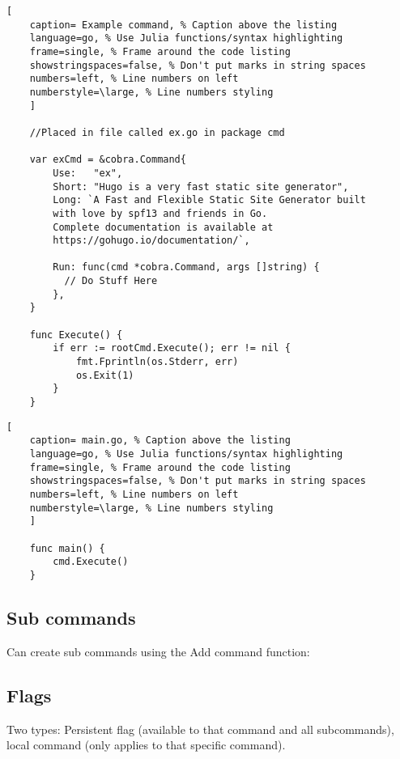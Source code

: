 \documentclass[11pt]{scrartcl} %
\begin{document}
\begin{lstlisting}[
	caption= Example command, % Caption above the listing
	language=go, % Use Julia functions/syntax highlighting
	frame=single, % Frame around the code listing
	showstringspaces=false, % Don't put marks in string spaces
	numbers=left, % Line numbers on left
	numberstyle=\large, % Line numbers styling
	]

	//Placed in file called ex.go in package cmd

	var exCmd = &cobra.Command{
		Use:   "ex",
		Short: "Hugo is a very fast static site generator",
		Long: `A Fast and Flexible Static Site Generator built 
		with love by spf13 and friends in Go.
		Complete documentation is available at 
		https://gohugo.io/documentation/`,

		Run: func(cmd *cobra.Command, args []string) {
		  // Do Stuff Here
		},
	}

	func Execute() {
  		if err := rootCmd.Execute(); err != nil {
    		fmt.Fprintln(os.Stderr, err)
    		os.Exit(1)
  		}
	}

\end{lstlisting}

\begin{lstlisting}[
	caption= main.go, % Caption above the listing
	language=go, % Use Julia functions/syntax highlighting
	frame=single, % Frame around the code listing
	showstringspaces=false, % Don't put marks in string spaces
	numbers=left, % Line numbers on left
	numberstyle=\large, % Line numbers styling
	]

	func main() {
		cmd.Execute()
	}

\end{lstlisting}

\subsection{Sub commands}

Can create sub commands using the Add command function:

\subsection{Flags}

Two types: Persistent flag (available to that command and all subcommands), local command 
(only applies to that specific command).
\end{document}
